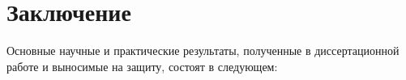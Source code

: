 \chapter*{Заключение}

Основные научные и практические результаты, полученные в
диссертационной работе и выносимые на защиту, состоят в следующем:

\Results


%
%
